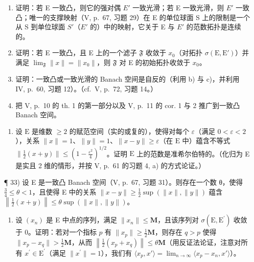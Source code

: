 \begin{enumerate}
\def\labelenumi{\alph{enumi})}
\item
  证明：若 E 一致凸，则它的强对偶 \(E'\) 一致光滑；若 E 一致光滑，则 \(E'\) 一致凸；唯一的支撑映射（V, p.~67, 习题 29）在 E 的单位球面 S 上的限制是一个从 S 到单位球面 \(S'\)（\(E'\) 的）中的映射，它关于 E 与 \(E'\) 的范数拓扑是连续的。
\item
  证明：若 E 一致凸，且 E 上的一个滤子 \(\mathfrak{F}\) 收敛于 \(x_{0}\)（对拓扑 \(\sigma(\mathrm{E}, \mathrm{E}')\)）并满足 \(\lim_{\mathfrak{F}} \|x\| = \|x_{0}\|\)，则 \(\mathfrak{F}\) 对 E 的初始拓扑收敛于 \(x_{0}\)。
\item
  证明：一致凸或一致光滑的 Banach 空间是自反的（利用 b) 与 c)，并利用 IV, p.~60, 习题 12）。（cf.~V, p.~72, 习题 14。）
\item
  把 V, p.~10 的 th. 1 的第一部分以及 V, p.~11 的 cor. 1 与 2 推广到一致凸 Banach 空间。
\end{enumerate}

\begin{enumerate}
\def\labelenumi{\arabic{enumi})}
\setcounter{enumi}{31}
\tightlist
\item
  设 \(\mathrm{E}\) 是维数 \(\geqslant 2\) 的赋范空间（实的或复的），使得对每个 \(\varepsilon\)（满足 \(0 < \varepsilon < 2\)），关系 \(\| x \| = 1\)、\(\| y \| = 1\)、\(\| x - y \| \geqslant \varepsilon\)（在 \(\mathrm{E}\) 中）蕴含不等式 \(\| \frac{1}{2}(x + y) \| \leqslant \left(1 - \frac{\varepsilon^2}{4}\right)^{1/2}\)。证明 \(\mathrm{E}\) 上的范数是准希尔伯特的。（化归为 E 是实且 2 维的情形，并按 V, p.~61 的习题 4, a) 的方式论证。）
\end{enumerate}

¶ 33) 设 E 是一致凸 Banach 空间（V, p.~67, 习题 31）。则存在一个数 θ，使得 \(\frac{3}{4} \leqslant \theta < 1\)，且使得 E 中的关系 \(\|x - y\| \geqslant \frac{1}{2} \sup (\|x\|, \|y\|)\) 蕴含 \(\left\|\frac{1}{2}(x + y)\right\| \leqslant \theta \sup (\|x\|, \|y\|)\)。

\begin{enumerate}
\def\labelenumi{\alph{enumi})}
\tightlist
\item
  设 \((x_{n})\) 是 E 中点的序列，满足 \(\| x_{n}\| \leqslant \mathbf{M}\)，且该序列对 \(\sigma (\mathrm{E},\mathrm{E}^{\prime})\) 收敛于 0。证明：若对一个指标 \(p\) 有 \(\| x_p\| \geqslant \frac{1}{2}\mathbf{M}\)，则存在 \(q > p\) 使得 \(\| x_p - x_q\| >\frac{1}{2}\mathbf{M}\)，从而 \(\left\| \frac{1}{2} (x_p + x_q)\right\| \leqslant \theta \mathbf{M}\)（用反证法论证，注意对所有 \(x^{\prime}\in \mathrm{E}^{\prime}\)（满足 \(\| x^{\prime}\| = 1\)），我们有 \(\langle x_p,x'\rangle = \lim_{n\to \infty}\langle x_p - x_n,x'\rangle\)）。
\end{enumerate}

